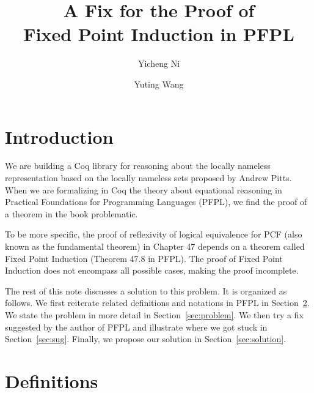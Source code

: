\documentclass{article}
\begin{document}
 
 

\newcommand{\fix}[2]{\mathrm{fix}^{#1}\;x:\tau\;\mathrm{is}\;\mathit{#2}}
\newcommand{\afix}[3]{#1\{\fix{#2}{#3}\}}
 
\title{A Fix for the Proof of \\
  Fixed Point Induction in PFPL}
\author{Yicheng Ni \and Yuting Wang}
 
\maketitle

\section{Introduction}

We are building a Coq library for reasoning about the locally nameless
representation based on the locally nameless sets proposed by Andrew Pitts.
When we are formalizing in Coq the theory about equational reasoning in
Practical Foundations for Programming Languages (PFPL),
we find the proof of a theorem in the book problematic.

To be more specific, the proof of
reflexivity of logical equivalence for PCF (also known as the fundamental theorem) in Chapter 47 depends on a theorem called Fixed Point Induction (Theorem 47.8 in PFPL).
The proof of Fixed Point Induction
does not encompass all possible cases, making the proof incomplete.

The rest of this note discusses a solution to this problem. It is
organized as follows.  We first reiterate related definitions and
notations in PFPL in Section~\ref{sec:def}.  We state the problem in more
detail in Section~\ref{sec:problem}.  We then try a fix suggested by
the author of PFPL and illustrate where we got stuck in Section~\ref{sec:sug}.
Finally, we propose our solution in Section~\ref{sec:solution}.

\section{Definitions}
\label{sec:def}
\end{document}
